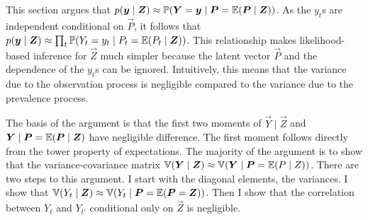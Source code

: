 \documentclass[thesis.tex]{subfiles}
\begin{document}
This section argues that $p(\bm{y} \mid \bm{Z}) \approx \operatorname{\mathbb{P}}(\bm{Y} = \bm{y} \mid \bm{P} = \operatorname{\mathbb{E}}(\bm{P} \mid \bm{Z}))$.
As the $y_t$s are independent conditional on $\vec{P}$, it follows that $p(\bm{y} \mid \bm{Z}) \approx \prod_t \operatorname{\mathbb{P}}(Y_t = y_t \mid P_t = \operatorname{\mathbb{E}}(P_t \mid \bm{Z}))$.
This relationship makes likelihood-based inference for $\vec{Z}$ much simpler because the latent vector $\vec{P}$ and the dependence of the $y_t$s can be ignored.
Intuitively, this means that the variance due to the observation process is negligible compared to the variance due to the prevalence process.

The basis of the argument is that the first two moments of $\vec{Y} \mid \vec{Z}$ and $\bm{Y} \mid \bm{P} = \operatorname{\mathbb{E}}(\bm{P} \mid \bm{Z})$ have negligible difference.
The first moment follows directly from the tower property of expectations.
The majority of the argument is to show that the variance-covariance matrix $\operatorname{\mathbb{V}}(\bm{Y} \mid \bm{Z}) \approx \operatorname{\mathbb{V}}(\bm{Y} \mid \bm{P} = \operatorname{\mathbb{E}}(P \mid Z))$.
There are two steps to this argument.
I start with the diagonal elements, the variances.
I show that $\operatorname{\mathbb{V}}(Y_t \mid \bm{Z}) \approx \operatorname{\mathbb{V}}(Y_t \mid \bm{P} = \operatorname{\mathbb{E}}(\bm{P} = \bm{Z}))$.
Then I show that the correlation between $Y_t$ and $Y_{t'}$ conditional only on $\vec{Z}$ is negligible.
\end{document}
